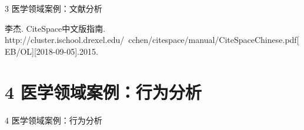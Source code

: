 \documentclass[11pt]{beamer}
\begin{document}
\begin{CJK}{UTF8}{gbsn}
\begin{frame}[plain]

\begin{center}
	\Huge 3 医学领域案例：文献分析
\end{center}

\end{frame}


\begin{frame}

李杰. CiteSpace中文版指南. http://cluster.ischool.drexel.edu/~cchen/citespace/manual/CiteSpaceChinese.pdf[EB/OL][2018-09-05].2015. 

\end{frame}

\section{4 医学领域案例：行为分析}

\begin{frame}[plain]

\begin{center}
	\Huge 4 医学领域案例：行为分析
\end{center}

\end{frame}


\end{CJK}
\end{document}
